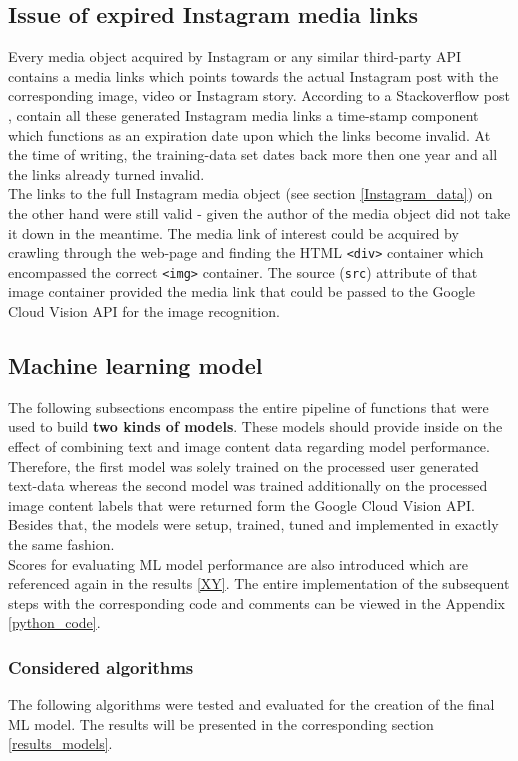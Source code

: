 \subsection{Issue of expired Instagram media links} \label{expired_media_links}
Every media object acquired by Instagram or any similar third-party API contains a media links which points towards the actual Instagram post with the corresponding image, video or Instagram story. According to a Stackoverflow post \parencite{Wayne2018}, contain all these generated Instagram media links a time-stamp component which functions as an expiration date upon which the links become invalid. At the time of writing, the training-data set dates back more then one year and all the links already turned invalid.\\
\newline
The links to the full Instagram media object (see section \ref{Instagram_data}) on the other hand were still valid - given the author of the media object did not take it down in the meantime. The media link of interest could be acquired by crawling through the web-page and finding the HTML \texttt{<div>} container which encompassed the correct \texttt{<img>} container. The source (\texttt{src}) attribute of that image container provided the media link that could be passed to the Google Cloud Vision API for the image recognition.

\subsection{Machine learning model} \label{ml_model}
The following subsections encompass the entire pipeline of functions that were used to build \textbf{two kinds of models}. These models should provide inside on the effect of combining text and image content data regarding model performance. Therefore, the first model was solely trained on the processed user generated text-data whereas the second model was trained additionally on the processed image content labels that were returned form the Google Cloud Vision API. Besides that, the models were setup, trained, tuned and implemented in exactly the same fashion.\\
Scores for evaluating ML model performance are also introduced which are referenced again in the results \ref{XY}. The entire implementation of the subsequent steps with the corresponding code and comments can be viewed in the Appendix \ref{python_code}.

\subsubsection{Considered algorithms} \label{ml_algorithms}
The following algorithms were tested and evaluated for the creation of the final ML model. The results will be presented in the corresponding section \ref{results_models}.

